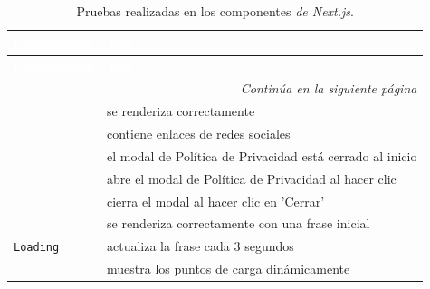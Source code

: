 \begin{longtable}{|p{5cm}|p{9cm}|}
    \caption{Pruebas realizadas en los componentes \textit{de Next.js}.} \label{tab:pruebas_componentes}                           \\

    \hline
    \rowcolor[HTML]{E6B8CE}
    \textbf{\textcolor{white}{Componente}}          & \textbf{\textcolor{white}{Test}}                                             \\ \hline
    \endfirsthead

    \hline
    \rowcolor[HTML]{E6B8CE}
    \textbf{\textcolor{white}{Componente}}          & \textbf{\textcolor{white}{Test}}                                             \\ \hline
    \endhead

    \hline \multicolumn{2}{|r|}{\textit{Continúa en la siguiente página}}                                                          \\ \hline
    \endfoot

    \hline
    \endlastfoot

    \multirow{5}{*}{\texttt{Footer}}                & se renderiza correctamente                                                   \\ \cline{2-2}
                                                    & contiene enlaces de redes sociales                                           \\ \cline{2-2}
                                                    & el modal de Política de Privacidad está cerrado al inicio                    \\ \cline{2-2}
                                                    & abre el modal de Política de Privacidad al hacer clic                        \\ \cline{2-2}
                                                    & cierra el modal al hacer clic en 'Cerrar'                                    \\ \hline

    \multirow{3}{*}{\texttt{Loading}}               & se renderiza correctamente con una frase inicial                             \\ \cline{2-2}
                                                    & actualiza la frase cada 3 segundos                                           \\ \cline{2-2}
                                                    & muestra los puntos de carga dinámicamente                                    \\ \hline


\end{longtable}
